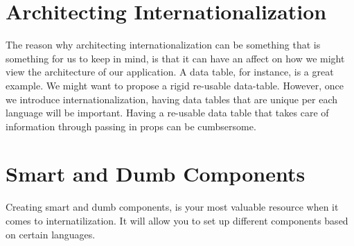 \section{ Architecting Internationalization }
The reason why architecting internationalization can be something that is
something for us to keep in mind, is that it can have an affect on how we might
view the architecture of our application. A data table, for instance, is a great
example. We might want to propose a rigid re-usable data-table. However, once
we introduce internationalization, having data tables that are unique per each
language will be important. Having a re-usable data table that takes care of
information through passing in props can be cumbsersome.

\section{ Smart and Dumb Components }
Creating smart and dumb components, is your most valuable resource when it comes
to internatilization. It will allow you to set up different components based on
certain languages. 
